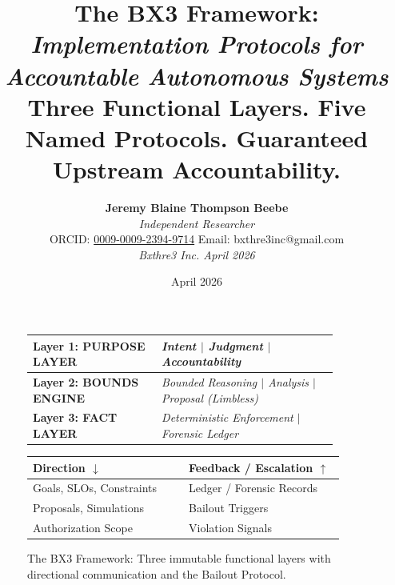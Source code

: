 \documentclass[12pt]{article}
\title{
    \vspace{1.2cm}
    {\LARGE \textbf{The BX3 Framework:}}\\[0.6em]
    {\large \textit{Implementation Protocols for Accountable Autonomous Systems}}\\[1.0em]
    {\normalsize Three Functional Layers. Five Named Protocols. Guaranteed Upstream Accountability.}
}
\author{
    \textbf{Jeremy Blaine Thompson Beebe}\\[0.2em]
    \textit{Independent Researcher}\\[0.3em]
    ORCID: \href{https://orcid.org/0009-0009-2394-9714}{0009-0009-2394-9714} \quad Email: bxthre3inc@gmail.com\\[0.3em]
    \textit{Bxthre3 Inc. \hfill April 2026}\\[0.3em]
}
\date{April 2026}
\begin{document}
\maketitle

\begin{figure}[htbp]
\centering
\caption{The BX3 Framework: Three immutable functional layers with directional communication and the Bailout Protocol.}
\label{fig:bx3loop}
\begin{tabular}{p{0.38\linewidth}p{0.52\linewidth}}
\toprule
\textbf{Layer 1: PURPOSE LAYER} & \hfill \textit{Intent $\mid$ Judgment $\mid$ Accountability} \\
\midrule
\textbf{Layer 2: BOUNDS ENGINE} & \hfill \textit{Bounded Reasoning $\mid$ Analysis $\mid$ Proposal (Limbless)} \\
\midrule
\textbf{Layer 3: FACT LAYER} & \hfill \textit{Deterministic Enforcement $\mid$ Forensic Ledger} \\
\bottomrule
\end{tabular}
\bigskip
\begin{tabular}{p{0.46\linewidth}p{0.46\linewidth}}
\toprule
\textbf{Direction $\downarrow$} & \textbf{Feedback / Escalation $\uparrow$} \\
\midrule
Goals, SLOs, Constraints & Ledger / Forensic Records \\
Proposals, Simulations & Bailout Triggers \\
Authorization Scope & Violation Signals \\
\bottomrule
\end{tabular}
\end{figure}

\thispagestyle{fancy}
\end{document}
